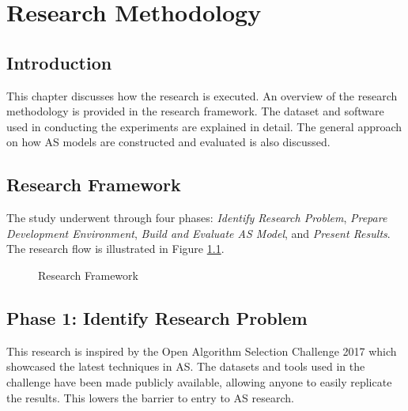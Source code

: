 \chapter{Research Methodology}
\section{Introduction}
This chapter discusses how the research is executed. An overview of the research methodology is provided in the research framework. The dataset and software used in conducting the experiments are explained in detail. The general approach on how AS models are constructed and evaluated is also discussed. 

\section{Research Framework}
\label{sec:researcframework}
The study underwent through four phases: \textit{Identify Research Problem}, \textit{Prepare Development Environment}, \textit{Build and Evaluate AS Model}, and \textit{Present Results}. The research flow is illustrated in Figure \ref{fig:researchframework}.

\begin{figure}[H]
	\centering
	\caption{Research Framework} 
	\label{fig:researchframework}
\end{figure}

\section{Phase 1: Identify Research Problem} 
This research is inspired by the Open Algorithm Selection Challenge 2017 \citep{lindauer2017open} which showcased the latest techniques in AS. The datasets and tools used in the challenge have been made publicly available, allowing anyone to easily replicate the results. This lowers the barrier to entry to AS research.

